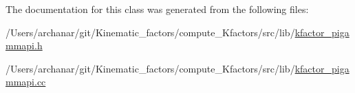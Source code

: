 The documentation for this class was generated from the following files\+:\begin{DoxyCompactItemize}
\item 
/\+Users/archanar/git/\+Kinematic\+\_\+factors/compute\+\_\+\+Kfactors/src/lib/\mbox{\hyperlink{kfactor__pigammapi_8h}{kfactor\+\_\+pigammapi.\+h}}\item 
/\+Users/archanar/git/\+Kinematic\+\_\+factors/compute\+\_\+\+Kfactors/src/lib/\mbox{\hyperlink{kfactor__pigammapi_8cc}{kfactor\+\_\+pigammapi.\+cc}}\end{DoxyCompactItemize}
